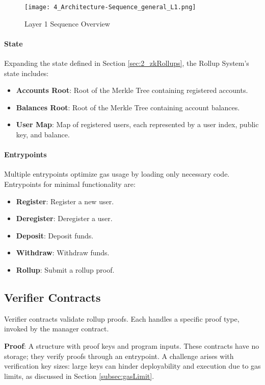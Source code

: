 \begin{figure}[ht]
  \centering
  \texttt{[image: 4\_Architecture-Sequence\_general\_L1.png]}
  \caption{Layer 1 Sequence Overview}
  \label{fig:layer1sequencediagram}
\end{figure}

\paragraph{State}
Expanding the state defined in Section \ref{sec:2_zkRollups}, the Rollup System's state includes:
\begin{itemize}
  \item \textbf{Accounts Root}: Root of the Merkle Tree containing registered accounts.
  \item \textbf{Balances Root}: Root of the Merkle Tree containing account balances.
  \item \textbf{User Map}: Map of registered users, each represented by a user index, public key, and balance.
\end{itemize}

\paragraph{Entrypoints}
Multiple entrypoints optimize gas usage by loading only necessary code. Entrypoints for minimal functionality are:
\begin{itemize}
  \item \textbf{Register}: Register a new user.
  \item \textbf{Deregister}: Deregister a user.
  \item \textbf{Deposit}: Deposit funds.
  \item \textbf{Withdraw}: Withdraw funds.
  \item \textbf{Rollup}: Submit a rollup proof.
\end{itemize}

\subsection{Verifier Contracts\label{sec:designverifiercontracts}}
Verifier contracts validate rollup proofs. Each handles a specific proof type, invoked by the manager contract.

\textbf{Proof}: A structure with proof keys and program inputs.
\newline These contracts have no storage; they verify proofs through an entrypoint. A challenge arises with verification key sizes: large keys can hinder deployability and execution due to gas limits, as discussed in Section \ref{subsec:gasLimit}. 

